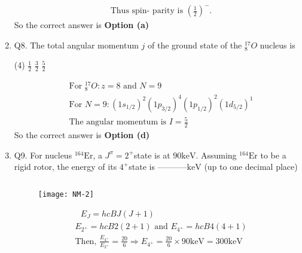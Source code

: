 \begin{enumerate}
\begin{answer}
\begin{align*}
		&\text { Thus spin- parity is }\left(\frac{1}{2}\right)^{-} \text {. }
		\end{align*}
		So the correct answer is \textbf{Option (a)}
	\end{answer}
	\item Q8. The total angular momentum $j$ of the ground state of the ${ }_8^{17} O$ nucleus is
	{}
	\begin{tasks}(4)
		\task[\textbf{a.}]$\frac{1}{2}$
		\task[\textbf{c.}]$\frac{3}{2}$
		\task[\textbf{d.}]$\frac{5}{2}$ 
	\end{tasks}
	\begin{answer}
		\begin{align*}
		&\text{For ${ }_8^{17} O: z=8$ and $N=9$}\\
		&\text{For $N=9:\left(1 s_{1 / 2}\right)^2\left(1 p_{3 / 2}\right)^4\left(1 p_{1 / 2}\right)^2\left(1 d_{5 / 2}\right)^1$}\\
		&\text{The angular momentum is $I=\frac{5}{2}$}
		\end{align*}
		So the correct answer is \textbf{Option (d)}
	\end{answer}
	\item Q9. For nucleus ${ }^{164} \mathrm{Er}$, a $J^\pi=2^{+}$state is at $90 \mathrm{keV}$. Assuming ${ }^{164} \mathrm{Er}$ to be a rigid rotor, the energy of its $4^{+}$state is -----------$\mathrm{keV}$ (up to one decimal place)
	{}
	\begin{answer}$\left. \right. $
		\begin{figure}[H]
			\centering
			\texttt{[image: NM-2]}
			\caption{}
			\label{}
		\end{figure}
		\begin{align*}
		&\text{ $E_J=h c B J(J+1)$}\\
		&E_{2^{+}}=h c B 2(2+1) \text { and } E_{4^{+}}=h c B 4(4+1)\\
		&\text{Then, $\frac{E_{4^{+}}}{E_{2^{+}}}=\frac{20}{6} \Rightarrow E_{4^{+}}=\frac{20}{6} \times 90 \mathrm{keV}=300 \mathrm{keV}$}
		\end{align*}
	\end{answer}
\end{enumerate}
\setlength\arrayrulewidth{1pt}
